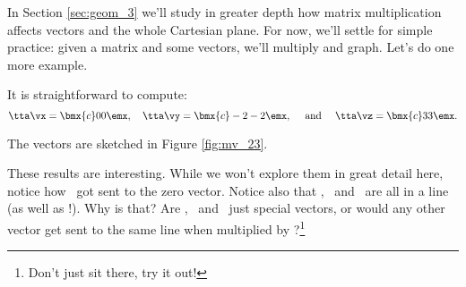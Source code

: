 \medskip

In Section \ref{sec:geom_3} we'll study in greater depth how matrix multiplication affects vectors and the whole Cartesian plane. For now, we'll settle for simple practice: given a matrix and some vectors, we'll multiply and graph. Let's do one more example.

\medskip


{\begin{myfigure}%
\begin{center}
\end{center}
\label{fig:mv_23}
\end{myfigure}%

It is straightforward to compute: 
\[
\tta\vx = \bmx{c} 0\\0\emx,\quad \tta\vy = \bmx{c} -2\\-2\emx, \quad \text{ and } \quad \tta\vz = \bmx{c} 3\\3\emx.
\]

The vectors are sketched in Figure \ref{fig:mv_23}.

These results are interesting. While we won't explore them in great detail here, notice how \vx\ got sent to the zero vector. Notice also that \tta\vx, \tta\vy\ and \tta\vz\ are all in a line (as well as \vx!). Why is that? Are \vx, \vy\ and \vz\ just special vectors, or would any other vector get sent to the same line when multiplied by \tta?\footnote{Don't just sit there, try it out!}
}

